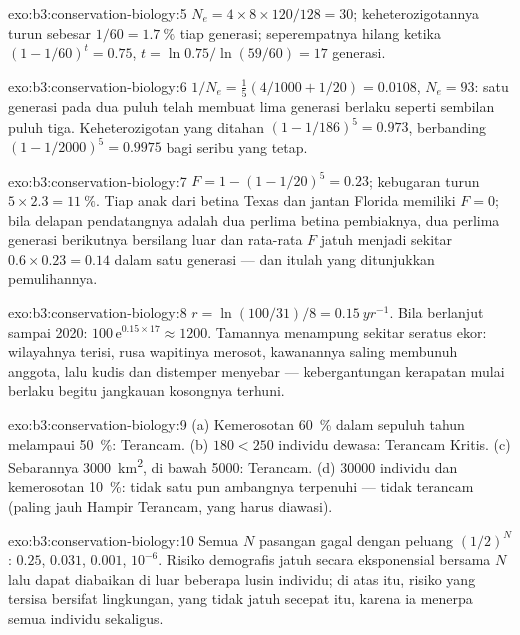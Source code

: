 \begin{solution}{exo:b3:conservation-biology:5}
$N_{e} = 4\times 8\times 120/128 = 30$; keheterozigotannya turun sebesar $1/60 =
\qty{1.7}{\%}$ tiap generasi; seperempatnya hilang ketika $(1 - 1/60)^{t} =
0.75$, $t = \ln 0.75/\ln(59/60) = 17$ generasi.
\end{solution}

\begin{solution}{exo:b3:conservation-biology:6}
$1/N_{e} = \tfrac{1}{5}(4/1000 + 1/20) = 0.0108$, $N_{e} = 93$: satu
generasi pada dua puluh telah membuat lima generasi berlaku seperti sembilan puluh tiga.
Keheterozigotan yang ditahan $(1 - 1/186)^{5} = 0.973$, berbanding $(1 -
1/2000)^{5} = 0.9975$ bagi seribu yang tetap.
\end{solution}

\begin{solution}{exo:b3:conservation-biology:7}
$F = 1 - (1 - 1/20)^{5} = 0.23$; kebugaran turun $5\times 2.3 = \qty{11}{\%}$.
Tiap anak dari betina Texas dan jantan Florida memiliki $F = 0$; bila
delapan pendatangnya adalah dua perlima betina pembiaknya, dua perlima
generasi berikutnya bersilang luar dan rata-rata $F$ jatuh menjadi sekitar
$0.6\times 0.23 = 0.14$ dalam satu generasi --- dan itulah yang ditunjukkan
pemulihannya.
\end{solution}

\begin{solution}{exo:b3:conservation-biology:8}
$r = \ln(100/31)/8 = \qty{0.15}{yr^{-1}}$. Bila berlanjut sampai 2020:
$100\,\mathrm{e}^{0.15\times 17} \approx 1200$. Tamannya menampung sekitar
seratus ekor: wilayahnya terisi, rusa wapitinya merosot, kawanannya saling
membunuh anggota, lalu kudis dan distemper menyebar --- kebergantungan
kerapatan mulai berlaku begitu jangkauan kosongnya terhuni.
\end{solution}

\begin{solution}{exo:b3:conservation-biology:9}
(a) Kemerosotan \qty{60}{\%} dalam sepuluh tahun melampaui \qty{50}{\%}: Terancam.
(b) $180 < 250$ individu dewasa: Terancam Kritis. (c) Sebarannya
\qty{3000}{km^2}, di bawah \qty{5000}{}: Terancam. (d) \num{30000}
individu dan kemerosotan \qty{10}{\%}: tidak satu pun ambangnya terpenuhi
--- tidak terancam (paling jauh Hampir Terancam, yang harus diawasi).
\end{solution}

\begin{solution}{exo:b3:conservation-biology:10}
Semua $N$ pasangan gagal dengan peluang $(1/2)^{N}$: $0.25$, $0.031$,
$0.001$, $10^{-6}$. Risiko demografis jatuh secara eksponensial bersama
$N$ lalu dapat diabaikan di luar beberapa lusin individu; di atas itu,
risiko yang tersisa bersifat lingkungan, yang tidak jatuh secepat itu,
karena ia menerpa semua individu sekaligus.
\end{solution}

